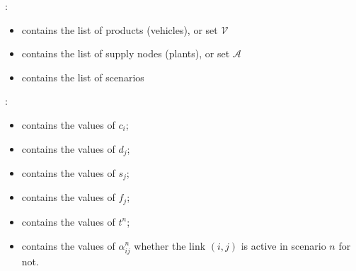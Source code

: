 \documentclass[letterpaper,10pt,english]{jupyterBook}
\begin{document}
\sphinxAtStartPar
{}:
\begin{itemize}
\item {} 
\sphinxAtStartPar
{} contains the list of products (vehicles), or set \(\mathcal{V}\)

\item {} 
\sphinxAtStartPar
{} contains the list of supply nodes (plants), or set \(\mathcal{A}\)

\item {} 
\sphinxAtStartPar
{} contains the list of scenarios

\end{itemize}

\sphinxAtStartPar
{}:
\begin{itemize}
\item {} 
\sphinxAtStartPar
{} contains the values of \(c_i\);

\item {} 
\sphinxAtStartPar
{} contains the values of \(d_j\);

\item {} 
\sphinxAtStartPar
{} contains the values of \(s_j\);

\item {} 
\sphinxAtStartPar
{} contains the values of \(f_j\);

\item {} 
\sphinxAtStartPar
{} contains the values of \(t^n\);

\item {} 
\sphinxAtStartPar
{} contains the values of \(\alpha^n_{ij}\) whether the link \((i,j)\) is active in scenario \(n\) for not.

\end{itemize}
\end{document}
